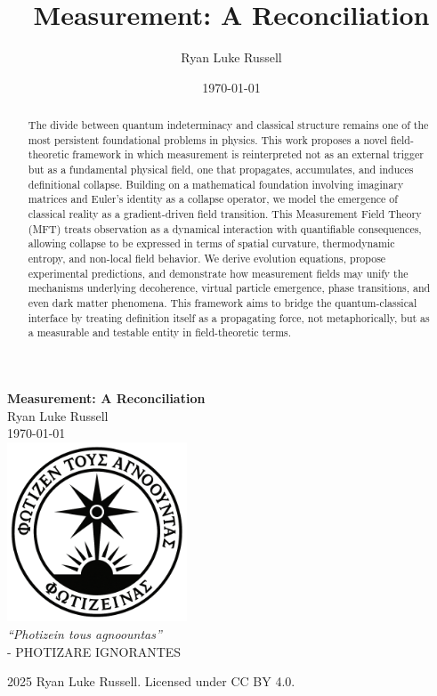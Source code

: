 \documentclass[12pt]{report}
\title{Measurement: A Reconciliation}
\author{Ryan Luke Russell}
\date{\today}
\begin{document}
\pagestyle{fancy}
\fancyhf{}
\lhead{\leftmark}
\rhead{\thepage}
\renewcommand{\headrulewidth}{0.4pt}
\renewcommand{\footrulewidth}{0pt}



\begin{titlepage}
    \centering
    \vspace*{2.5cm}
    {\Huge\bfseries Measurement: A Reconciliation \\[0.5em]}
    {\LARGE Ryan Luke Russell}\\[0.5cm]
    {\large \today}\\[3cm]
    \includegraphics[width=0.4\textwidth]{images/morningstar.png}\\[1cm]
    {\Large\itshape \textquotedblleft Photizein tous agnoountas\textquotedblright}\\
    {\large - PHOTIZARE IGNORANTES}
    \vfill
\end{titlepage}

\begin{abstract}
The divide between quantum indeterminacy and classical structure remains one of the most persistent foundational problems in physics. This work proposes a novel field-theoretic framework in which measurement is reinterpreted not as an external trigger but as a fundamental physical field, one that propagates, accumulates, and induces definitional collapse. Building on a mathematical foundation involving imaginary matrices and Euler's identity as a collapse operator, we model the emergence of classical reality as a gradient-driven field transition. This Measurement Field Theory (MFT) treats observation as a dynamical interaction with quantifiable consequences, allowing collapse to be expressed in terms of spatial curvature, thermodynamic entropy, and non-local field behavior. We derive evolution equations, propose experimental predictions, and demonstrate how measurement fields may unify the mechanisms underlying decoherence, virtual particle emergence, phase transitions, and even dark matter phenomena. This framework aims to bridge the quantum-classical interface by treating definition itself as a propagating force, not metaphorically, but as a measurable and testable entity in field-theoretic terms.
\end{abstract}
  
\tableofcontents



\nocite{*}


\printbibliography

\vspace{2cm}
\begin{center}
    \textcopyright{}
    2025 Ryan Luke Russell. Licensed under CC BY 4.0.
\end{center}
\end{document}
